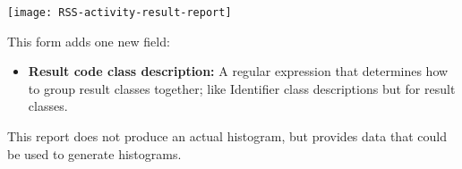 \begin{changemargin}{1.5in}{0in}
\texttt{[image: RSS-activity-result-report]}

This form adds one new field:

\begin{itemize}

\item \textbf{Result code class description:} A regular expression that
determines how to group result classes together; like Identifier class
descriptions but for result classes.

\end{itemize}

This report does not produce an actual histogram, but provides data that
could be used to generate histograms.  


\end{changemargin}
